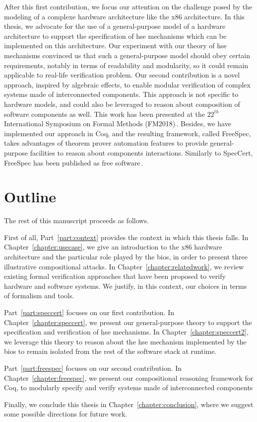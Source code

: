 After this first contribution, we focus our attention on the challenge posed by
the modeling of a complexe hardware architecture like the x86 architecture.
%
In this thesis, we advocate for the use of a general-purpose model of a hardware
architecture to support the specification of \ac{hse} mechanisms which can be
implemented on this architecture.
%
Our experiment with our theory of \ac{hse} mechanisms convinced us that such a
general-purpose model should obey certain requirements, notably in terms of
readability and modularity, so it could remain applicable to real-life
verification problem.
%
Our second contribution is a novel approach, inspired by algebraic effects, to
enable modular verification of complex systems made of interconnected
components.
%
This approach is not specific to hardware models, and could also be leveraged to
reason about composition of software components as well.
%
This work has been presented at the $22^{th}$ International Symposium on Formal
Methods (FM2018)\,\cite{letan2018freespec}.
%
Besides, we have implemented our approach in Coq, and the resulting framework,
called FreeSpec, takes advantages of theorem prover automation features to
provide general-purpose facilities to reason about components interactions.
%
Similarly to SpecCert, FreeSpec has been published as free
software\,\cite{letan2018freespeccode}.

\section{Outline}

The rest of this manuscript proceeds as follows.

First of all, Part~\ref{part:context} provides the context in which this thesis
falls.
%
In Chapter~\ref{chapter:usecase}, we give an introduction to the x86 hardware
architecture and the particular role played by the \ac{bios}, in order to
present three illustrative compositional attacks.
%
In Chapter~\ref{chapter:relatedwork}, we review existing formal verification
approaches that have been proposed to verify hardware and software systems.
%
We justify, in this context, our choices in terms of formalism and tools.

Part~\ref{part:speccert} focuses on our first contribution.
%
In Chapter~\ref{chapter:speccert}, we present our general-purpose theory to
support the specification and verification of \ac{hse} mechanisms.
%
In Chapter~\ref{chapter:speccert2}, we leverage this theory to reason about the
\ac{hse} mechanism implemented by the \ac{bios} to remain isolated from the rest
of the software stack at runtime.

Part~\ref{part:freespec} focuses on our second contribution.
%
In Chapter~\ref{chapter:freespec}, we present our compositional reasoning
framework for Coq, to modularly specify and verify systems made of
interconnected components

Finally, we conclude this thesis in Chapter~\ref{chapter:conclusion}, where we
suggest some possible directions for future work.
